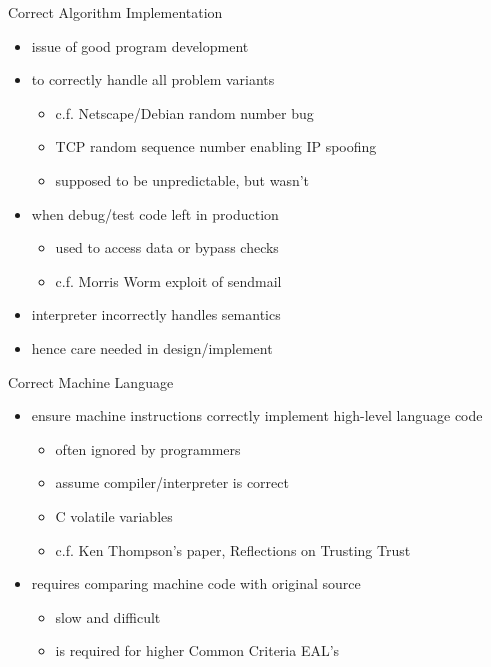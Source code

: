 \documentclass{beamer}
\begin{document}
\begin{frame}{Correct Algorithm Implementation}
  \begin{itemize}
  \item issue of good program development
  \item to correctly handle all problem variants
  \begin{itemize}
    \item c.f. Netscape/Debian random number bug
    \item TCP random sequence number enabling IP spoofing
    \item supposed to be unpredictable, but wasn't
  \end{itemize}
  \item when debug/test code left in production
  \begin{itemize}
    \item used to access data or bypass checks
    \item c.f. Morris Worm exploit of sendmail
  \end{itemize}
  \item interpreter incorrectly handles semantics
  \item hence care needed in design/implement 
  \end{itemize}
\end{frame}

\begin{frame}{Correct Machine Language}
  \begin{itemize}
  \item ensure machine instructions correctly
    implement high-level language code
  \begin{itemize}
    \item often ignored by programmers
    \item assume compiler/interpreter is correct
    \item C volatile variables
    \item c.f. Ken Thompson’s paper, Reflections on Trusting Trust
  \end{itemize}
  \item requires comparing machine code with original
source
  \begin{itemize}
    \item slow and difficult
    \item is required for higher Common Criteria EAL’s
  \end{itemize}
  \end{itemize}
\end{frame}
\end{document}

